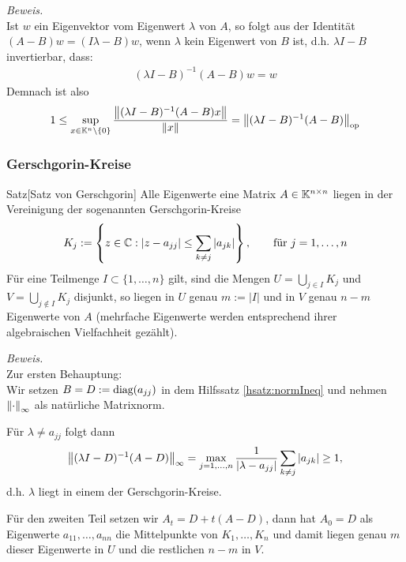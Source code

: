 \textit{Beweis.} \\
Ist $w$ ein Eigenvektor vom Eigenwert $\lambda$ von $A$, so folgt aus der Identität 
$(A-B)w = (I\lambda - B)w$, wenn $\lambda$ kein Eigenwert von $B$ ist, d.h. $\lambda I-B$ invertierbar, dass:
% 
\begin{align*}
  (\lambda I-B)^{-1}(A-B)w = w
\end{align*}
%
Demnach ist also 
%
\begin{align*}
  1\leq \sup_{x\in\K^n\backslash\{0\}} \dfrac{\vertn{2}{(\lambda I-B)^{-1}(A-B)x}}{\vertn{2}{x}}
  =\vertn{2}{(\lambda I-B)^{-1}(A-B)}_{\op}
\end{align*}
%
\subsubsection{Gerschgorin-Kreise}
%
\begin{colbox}{Satz}[Satz von Gerschgorin]\label{satz:gerschgorin}
  Alle Eigenwerte eine Matrix $A\in\mathbb K^{n\times n}$ liegen in der Vereinigung der sogenannten 
  Gerschgorin-Kreise
  \begin{align*}
    K_j := \left\{z\in\mathbb C : |z-a_{jj}|\leq \sum_{k\neq j} |a_{jk}|\right\},
    \qquad \text{für } j=1,\dots,n
  \end{align*}
  Für eine Teilmenge $I\subset\{1,\dots,n\}$ gilt, sind die Mengen $U=\displaystyle \bigcup_{j\in I} K_j$ 
  und $V=\displaystyle \bigcup_{j\notin I} K_j$ disjunkt, so liegen in $U$ genau $m:=|I|$ und in $V$ genau $n-m$ 
  Eigenwerte von $A$ (mehrfache Eigenwerte werden entsprechend ihrer algebraischen Vielfachheit gezählt).
\end{colbox}

\textit{Beweis.} \\
Zur ersten Behauptung: \\
Wir setzen $B=D:=\text{diag}(a_{jj})$ in dem Hilfssatz \ref{hsatz:normIneq} und nehmen 
$\vertn{2}{\cdot}_\infty$ als natürliche Matrixnorm. 

Für $\lambda\neq a_{jj}$ folgt dann 
%
\begin{align*}
  \vertn{2}{(\lambda I -D)^{-1}(A-D)}_\infty 
  = \max_{j=1,\dots,n}\dfrac{1}{|\lambda-a_{jj}|}\sum_{k\neq j} |a_{jk}|
  \geq 1,
\end{align*}
%
d.h. $\lambda$ liegt in einem der Gerschgorin-Kreise. 

Für den zweiten Teil setzen wir $A_t = D + t(A-D)$, 
dann hat $A_0 = D$ als Eigenwerte $a_{11},\dots,a_{nn}$ die Mittelpunkte von $K_1,\dots,K_n$ 
und damit liegen genau $m$ dieser Eigenwerte in $U$ und die restlichen $n-m$ in $V$. 

